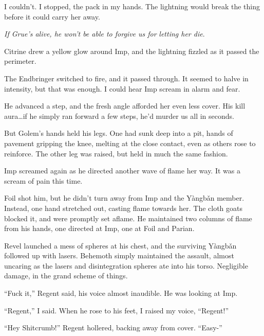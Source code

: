 I couldn't.  I stopped, the pack in my hands.  The lightning would break the thing before it could carry her away.



\emph{If Grue's alive, he won't be able to forgive us for }\emph{letting her die}.



Citrine drew a yellow glow around Imp, and the lightning fizzled as it passed the perimeter.



The Endbringer switched to fire, and it passed through.  It seemed to halve in intensity, but that was enough.  I could hear Imp scream in alarm and fear.



He advanced a step, and the fresh angle afforded her even less cover.  His kill aura\ldots if he simply ran forward a few steps, he'd murder us all in seconds.



But Golem's hands held his legs.  One had sunk deep into a pit, hands of pavement gripping the knee, melting at the close contact, even as others rose to reinforce.  The other leg was raised, but held in much the same fashion.



Imp screamed again as he directed another wave of flame her way.  It was a scream of pain this time.



Foil shot him, but he didn't turn away from Imp and the Y\`{a}ngb\v{a}n member.  Instead, one hand stretched out, casting flame towards her.  The cloth goats blocked it, and were promptly set aflame.  He maintained two columns of flame from his hands, one directed at Imp, one at Foil and Parian.



Revel launched a mess of spheres at his chest, and the surviving Y\`{a}ngb\v{a}n followed up with lasers.  Behemoth simply maintained the assault, almost uncaring as the lasers and disintegration spheres ate into his torso.  Negligible damage, in the grand scheme of things.



``Fuck it,'' Regent said, his voice almost inaudible.  He was looking at Imp.



``Regent,'' I said.  When he rose to his feet, I raised my voice, ``Regent!''



``Hey Shitcrumb!''  Regent hollered, backing away from cover.  ``Easy-''



